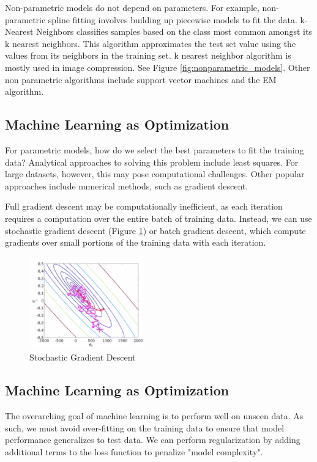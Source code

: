 \documentclass[twoside]{article}
\begin{document}
Non-parametric models do not depend on parameters. For example, non-parametric spline fitting involves building up piecewise models to fit the data. k-Nearest Neighbors classifies samples based on the class most common amongst its k nearest neighbors. This algorithm approximates the test set value using the values from its neighbors in the training set. k nearest neighbor algorithm is mostly used in image compression. See Figure \ref{fig:nonparametric_models}. Other non parametric algorithms include support vector machines and the EM algorithm.


\subsection{Machine Learning as Optimization}

For parametric models, how do we select the best parameters to fit the training data? Analytical approaches to solving this problem include least squares. For large datasets, however, this may pose computational challenges. Other popular approaches include numerical methods, such as gradient descent.

Full gradient descent may be computationally inefficient, as each iteration requires a computation over the entire batch of training data. Instead, we can use stochastic gradient descent (Figure \ref{fig:sgd}) or batch gradient descent, which compute gradients over small portions of the training data with each iteration.

\begin{figure}[!ht]%
    \centering
    \includegraphics[width=5cm]{sgd}
    \caption{Stochastic Gradient Descent}
    \label{fig:sgd}%
\end{figure}

\subsection{Machine Learning as Optimization}

The overarching goal of machine learning is to perform well on unseen data. As such, we must avoid over-fitting on the training data to ensure that model performance generalizes to test data. We can perform regularization by adding additional terms to the loss function to penalize "model complexity".
\end{document}
